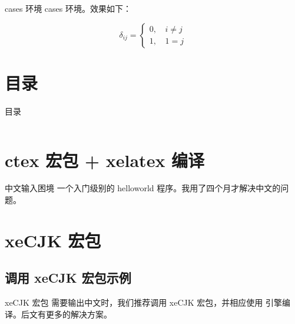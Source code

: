 \documentclass[final,aspectratio=32]{ctexbeamer}
\begin{document}
\begin{frame}[fragile]{cases 环境}
cases 环境。效果如下：
\begin{sidelst}
\begin{equation}
  \delta_{ij} =
  \begin{cases}
    0, \, & i \ne j \\
    1, & 1 = j
  \end{cases}
\end{equation}
\end{sidelst}
\end{frame}

\section*{目录}
\begin{frame}{目录}
\begin{columns}
  \begin{column}{.6\linewidth}
  \tableofcontents[hideallsubsections]
  \end{column}
  \begin{column}{.4\linewidth}
  \end{column}
\end{columns}
\end{frame}

\section{ctex 宏包 + xelatex 编译}
\begin{frame}[fragile]{中文输入困境}
一个入门级别的 helloworld 程序。我用了四个月才解决中文的问题。
\end{frame}


\section{xeCJK 宏包}
\subsection[示例]{调用 xeCJK 宏包示例}
\begin{frame}[fragile]{xeCJK 宏包}
需要输出中文时，我们推荐调用 xeCJK 宏包，并相应使用  引擎编译。后文有更多的解决方案。
\end{frame}
\end{document}
